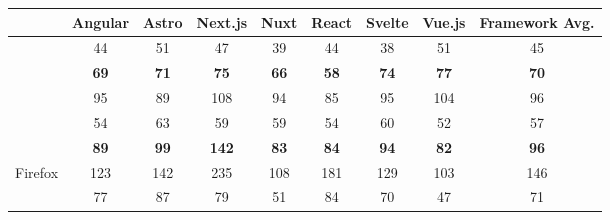 \documentclass[a4paper, 12pt]{article}
\begin{document}
\begin{table}[h!]
  \centering
  {
  \footnotesize
  \begin{adjustbox}{angle=90}
    {
      \begin{tabular}{|l|c|c|c|c|c|c|c|c|}
        \hline
        ~                                            & \textbf{Angular} & \textbf{Astro}                  & \textbf{Next.js}               & \textbf{Nuxt}           & \textbf{React} & \textbf{Svelte} & \textbf{Vue.js} & \textbf{Framework Avg.}  \\ \hline
\rowcolor{white}                                     & 44               & 51                              & 47                             & 39                      & 44             & 38              & 51              & 45                \\
\rowcolor{white}                                     & \textbf{69}      & \textbf{71}                     & \textbf{75}                    & \textbf{66}             & \textbf{58}    & \textbf{74}     & \textbf{77}     & \textbf{70}       \\
\rowcolor{white} \multirow{-3}{*}{Chromium}          & 95               & 89                              & 108                            & 94                      & 85             & 95              & 104             & 96                \\ \hline
                                                     & 54               & 63                              & 59                             & 59                      & 54             & 60              & 52              & 57                \\
                                                     & \textbf{89}      & \textbf{99}                     & \textbf{142}                   & \textbf{83}             & \textbf{84}    & \textbf{94}     & \textbf{82}     & \textbf{96}       \\
                 \multirow{-3}{*}{Firefox}           & 123              & 142                             & 235                            & 108                     & 181            & 129             & 103             & 146               \\ \hline
\rowcolor{white}                                     & 77               & \cellcolor{red!50}87            & 79                             & 51                      & 84             & 70              & 47              & 71                \\

\end{tabular}}
\end{adjustbox}}
\end{table}
\end{document}
